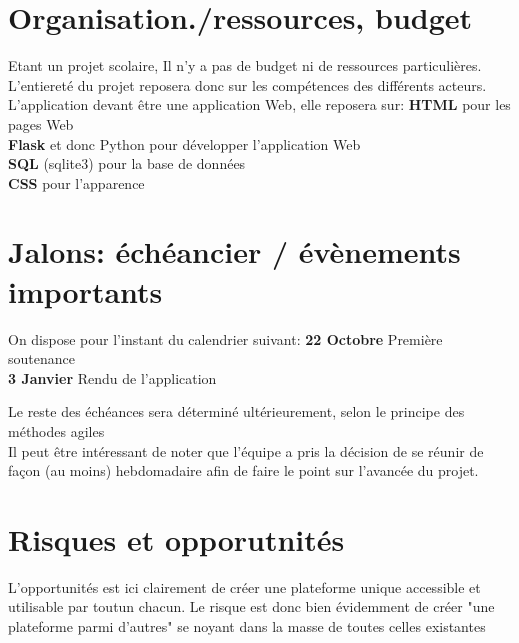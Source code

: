 \newpage

\section{Organisation./ressources, budget}
Etant un projet scolaire, Il n'y a pas de budget ni de ressources particulières. L'entiereté du projet reposera donc sur les compétences des différents acteurs.\\
L'application devant être une application Web, elle reposera sur:
	\textbf{HTML} pour les pages Web \\
	\textbf{Flask} et donc Python pour développer l'application Web \\
	\textbf{SQL} (sqlite3) pour la base de données \\
	\textbf{CSS} pour l'apparence

\section{Jalons: échéancier / évènements importants}
On dispose pour l'instant du calendrier suivant:
	\textbf{22 Octobre} Première soutenance \\
	\textbf{3 Janvier} Rendu de l'application

Le reste des échéances sera déterminé ultérieurement, selon le principe des méthodes agiles \\
Il peut être intéressant de noter que l'équipe a pris la décision de se réunir de façon (au moins) hebdomadaire afin de faire le point sur l'avancée du projet.


\section{Risques et opporutnités}
L'opportunités est ici clairement de créer une plateforme unique accessible et utilisable par toutun chacun. Le risque est donc bien évidemment de créer "une plateforme parmi d'autres" se noyant dans la masse de toutes celles existantes
